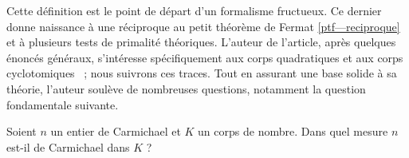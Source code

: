 Cette définition est le point de départ d'un formalisme fructueux. Ce dernier donne naissance à une réciproque au petit théorème de Fermat \ref{ptf—reciproque} et à plusieurs tests de primalité théoriques. L'auteur de l'article, après quelques énoncés généraux, s'intéresse spécifiquement aux corps quadratiques et aux corps cyclotomiques ~; nous suivrons ces traces. Tout en assurant une base solide à sa théorie, l'auteur soulève de nombreuses questions, notamment la question fondamentale suivante.

\begin{question}\label{question-centrale}Soient $n$ un entier de Carmichael et $K$ un corps de nombre. Dans quel mesure $n$ est-il de Carmichael dans $K$ ?
\end{question}

